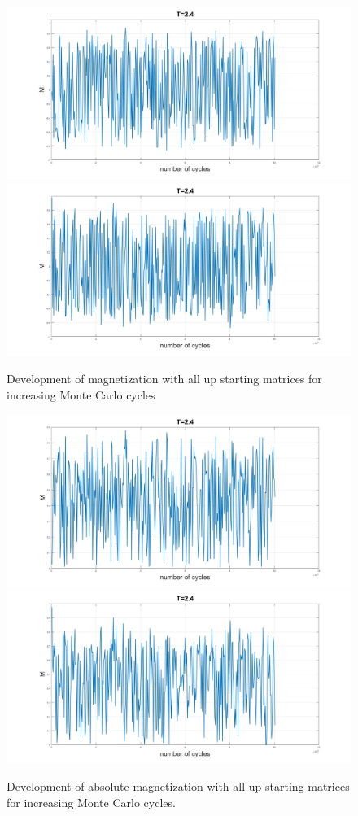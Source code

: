 \documentclass[10pt,a4paper]{article}
\begin{document}
\begin{figure} [H]
\centerline{
\includegraphics[scale=0.15]{RANDOMmag24notabs.jpg}
\includegraphics[scale=0.15]{UPmag24notabs.jpg}
}
\caption{Development of magnetization with all up starting matrices for increasing Monte Carlo cycles}
\label{fig:UpMagNotAbs}
\end{figure}


\begin{figure} [H]
\centerline{
\includegraphics[scale=0.15]{RANDOMmag24abs.jpg}
\includegraphics[scale=0.15]{UPmag24abs.jpg}
}
\caption{Development of absolute magnetization with all up starting matrices for increasing Monte Carlo cycles.}
\label{fig:UpMagnetizm}
\end{figure}
\end{document}
